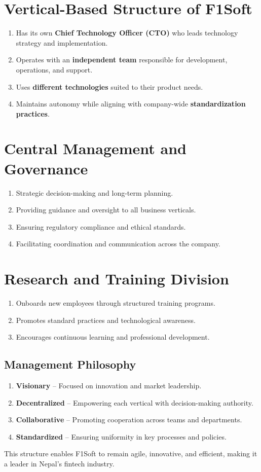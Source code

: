 \documentclass[12pt, a4paper]{report}
\begin{document}
\section{Vertical-Based Structure of F1Soft}
\begin{enumerate}
    \item Has its own \textbf{Chief Technology Officer (CTO)} who leads technology strategy and implementation.
    \item Operates with an \textbf{independent team} responsible for development, operations, and support.
    \item Uses \textbf{different technologies} suited to their product needs.
    \item Maintains autonomy while aligning with company-wide \textbf{standardization practices}.
\end{enumerate}
\vspace{18pt}
\section{Central Management and Governance}
\begin{enumerate}
    \item Strategic decision-making and long-term planning.
    \item Providing guidance and oversight to all business verticals.
    \item Ensuring regulatory compliance and ethical standards.
    \item Facilitating coordination and communication across the company.
\end{enumerate}
\vspace{18pt}
\section{Research and Training Division}
\begin{enumerate}
    \item Onboards new employees through structured training programs.
    \item Promotes standard practices and technological awareness.
    \item Encourages continuous learning and professional development.
\end{enumerate}
\pagebreak
\subsection{Management Philosophy}
\begin{enumerate}
    \item \textbf{Visionary} – Focused on innovation and market leadership.
    \item \textbf{Decentralized} – Empowering each vertical with decision-making authority.
    \item \textbf{Collaborative} – Promoting cooperation across teams and departments.
    \item \textbf{Standardized} – Ensuring uniformity in key processes and policies.
\end{enumerate}
This structure enables F1Soft to remain agile, innovative, and efficient, making it a leader in Nepal’s fintech industry.
\end{document}
